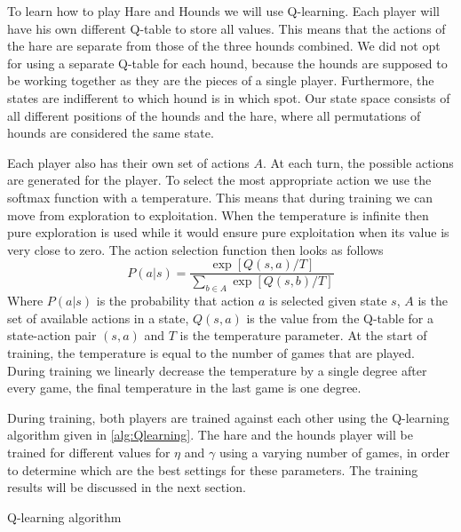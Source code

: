 To learn how to play Hare and Hounds we will use Q-learning\cite{watkins1992q}.
Each player will have his own different Q-table to store all values. This means that the
actions of the hare are separate from those of the three hounds combined. We
did not opt for using a separate Q-table for each hound, because the hounds are
supposed to be working together as they are the pieces of a single player. Furthermore,
the states are indifferent to which hound is in which spot. Our state space consists
of all different positions of the hounds and the hare, where all permutations of hounds are considered the same state.

Each player also has their own set of actions $A$. At each turn, the possible actions
are generated for the player. To select the most appropriate action we use 
the softmax function with a temperature. This means that during training we 
can move from exploration to exploitation. When the temperature is infinite then 
pure exploration is used while it would ensure pure exploitation when its value 
is very close to zero. The action selection function then looks as follows
\[ P(a|s) = \frac{\exp[Q(s,a)/T]}{\sum_{b \in A} \exp[Q(s, b)/T]} \]
Where $P(a|s)$ is the probability that action $a$ is selected given state $s$, $A$
is the set of available actions in a state, $Q(s,a)$ is the value from the
Q-table for a state-action pair $(s,a)$ and $T$ is the temperature parameter. At the start 
of training, the temperature is equal to the number of games that are played. During
training we linearly decrease the temperature by a single degree after every
game, the final temperature in the last game is one degree.

During training, both players are trained against each other using the Q-learning algorithm
given in \autoref{alg:Qlearning}. The hare and the hounds player will be trained for different
values for $\eta$ and $\gamma$ using a varying number of games, in order to determine which are the best settings for these parameters. The training results will be discussed in the next section.

\begin{algorithm}
\caption{Q-learning algorithm \cite{alpaydin}}
\label{alg:Qlearning}
\begin{algorithmic}[1]
	\Repeat
\EndFor
\end{algorithmic}
\end{algorithm}

